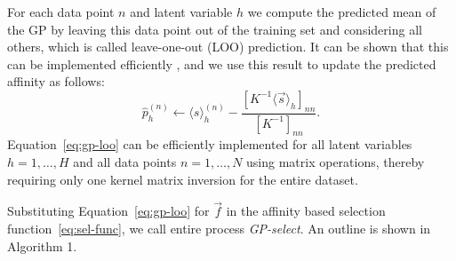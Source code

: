 For each data point $n$ and latent variable $h$ we compute the predicted mean of the GP by leaving 
this data point out of the training set and considering all others, which is called leave-one-out (LOO) prediction.
It can be shown that this can be implemented efficiently \citep[see Section 5.4.2 in ][]{RasmussenGPbook}, 
and we use this result to update the predicted affinity as follows:
%
%
\vspace{-.2cm}  %
\begin{equation}\label{eq:gp-loo}
\hat{p}_{h}^{(n)} \leftarrow   
\langle s \rangle_h^{(n)} - \frac{ [ K^{-1} \langle\vec{s}\rangle_{h} ]_{nn} }{ [ K^{-1} ]_{nn} }.
\end{equation}
%
%
Equation~\eqref{eq:gp-loo} can be efficiently implemented for all latent variables $h=1,\dots,H$ and all data points $n=1,\dots,N$ using matrix operations, thereby requiring only one kernel matrix inversion for the entire dataset.
%
%
%

Substituting Equation~\eqref{eq:gp-loo} for $\vec{f}$ in the affinity based selection function~\eqref{eq:sel-func}, 
we call entire process \textit{GP-select}. An outline is shown in Algorithm 1.

